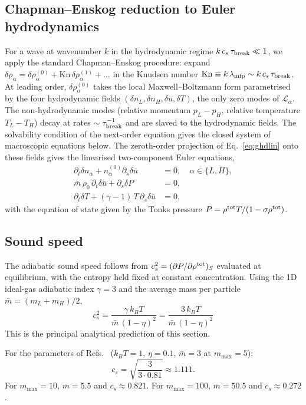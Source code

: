 \documentclass[aps,pre,twocolumn,superscriptaddress,longbibliography,floatfix]{revtex4-2}
\begin{document}
\subsection{Chapman--Enskog reduction to Euler hydrodynamics}

For a wave at wavenumber $k$ in the hydrodynamic regime
$k\,c_s\,\tau_{\rm break}\ll 1$, we apply the standard
Chapman--Enskog procedure: expand $\delta\rho_\alpha = \delta
\rho_\alpha^{(0)} + \mathrm{Kn}\,\delta\rho_\alpha^{(1)} + \dots$
in the Knudsen number $\mathrm{Kn} \equiv
k\,\lambda_{\rm mfp} \sim k\,c_s\,\tau_{\rm break}$.
At leading order, $\delta\rho_\alpha^{(0)}$ takes the local
Maxwell--Boltzmann form parametrised by the four hydrodynamic
fields $(\delta n_L, \delta n_H, \delta\bar u, \delta T)$,
the only zero modes of $\mathcal{L}_\alpha$. The
non-hydrodynamic modes (relative momentum $p_L-p_H$, relative
temperature $T_L-T_H$) decay at rates $\sim\tau_{\rm break}^{-1}$
and are slaved to the hydrodynamic fields. The solvability
condition of the next-order equation gives the closed system
of macroscopic equations below. The
zeroth-order projection of Eq.~\eqref{eq:ghdlin} onto these
fields gives the linearised two-component Euler equations,
\begin{align}
\partial_t \delta n_\alpha + n_\alpha^{(0)}\partial_s\delta\bar u &= 0,
\quad \alpha\in\{L,H\},\\
\bar m\,\rho_0\,\partial_t \delta\bar u + \partial_s\delta P &= 0,\\
\partial_t \delta T + (\gamma-1)\,T\,\partial_s\delta\bar u &= 0,
\end{align}
with the equation of state given by the Tonks pressure
$P=\rho^{\rm tot} T/(1-\sigma\rho^{\rm tot})$.

\subsection{Sound speed} The adiabatic
sound speed follows from
$c_s^2 = (\partial P/\partial \rho^{\rm tot})_S$ evaluated at
equilibrium, with the entropy held fixed at constant
concentration. Using the 1D ideal-gas adiabatic index
$\gamma=3$ and the average mass per particle
$\bar m = (m_L+m_H)/2$,
\begin{equation}
\boxed{\;c_s^2 = \frac{\gamma\,k_B T}{\bar m\,(1-\eta)^2}
         = \frac{3\,k_B T}{\bar m\,(1-\eta)^2}\;}
\label{eq:cs}
\end{equation}
This is the principal analytical prediction of this section.

For the parameters of Refs.~\cite{PaperII,PaperIII}
($k_BT=1$, $\eta=0.1$, $\bar m=3$ at $m_{\max}=5$):
\begin{equation}
c_s = \sqrt{\frac{3}{3\cdot 0.81}} \approx 1.111.
\label{eq:csnum}
\end{equation}
For $m_{\max}=10$, $\bar m=5.5$ and $c_s\approx 0.821$. For
$m_{\max}=100$, $\bar m=50.5$ and $c_s\approx 0.272$.
\end{document}
